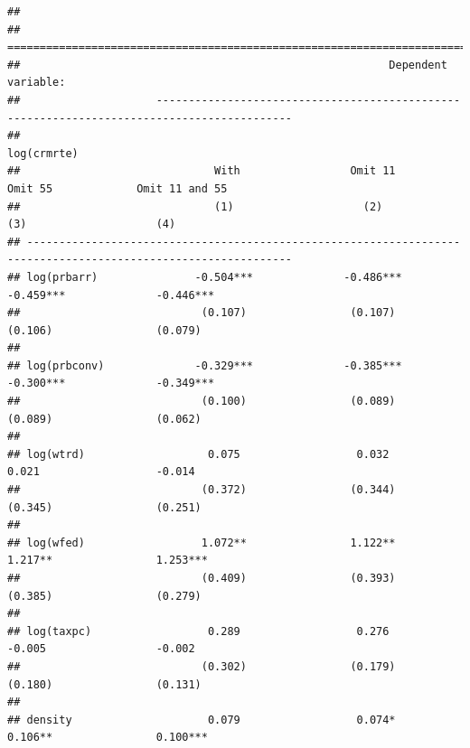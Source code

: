 \documentclass[]{article}
\begin{document}
\begin{verbatim}
## 
## ===============================================================================================================
##                                                         Dependent variable:                                    
##                     -------------------------------------------------------------------------------------------
##                                                             log(crmrte)                                        
##                              With                 Omit 11                Omit 55             Omit 11 and 55    
##                              (1)                    (2)                    (3)                    (4)          
## ---------------------------------------------------------------------------------------------------------------
## log(prbarr)               -0.504***              -0.486***              -0.459***              -0.446***       
##                            (0.107)                (0.107)                (0.106)                (0.079)        
##                                                                                                                
## log(prbconv)              -0.329***              -0.385***              -0.300***              -0.349***       
##                            (0.100)                (0.089)                (0.089)                (0.062)        
##                                                                                                                
## log(wtrd)                   0.075                  0.032                  0.021                  -0.014        
##                            (0.372)                (0.344)                (0.345)                (0.251)        
##                                                                                                                
## log(wfed)                  1.072**                1.122**                1.217**                1.253***       
##                            (0.409)                (0.393)                (0.385)                (0.279)        
##                                                                                                                
## log(taxpc)                  0.289                  0.276                  -0.005                 -0.002        
##                            (0.302)                (0.179)                (0.180)                (0.131)        
##                                                                                                                
## density                     0.079                  0.074*                0.106**                0.100***       

\end{verbatim}
\end{document}
